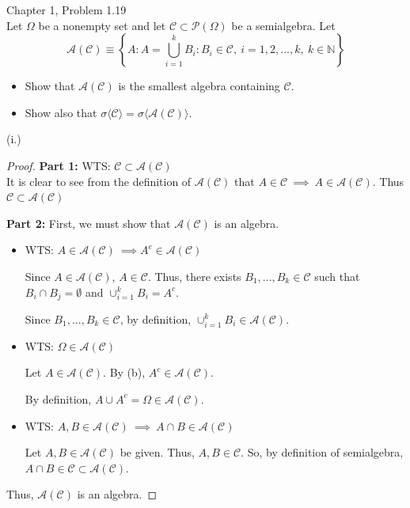 \documentclass[12pt,letterpaper, onecolumn]{exam}
\newcommand{\nat}{\mathbb{N}}
\newcommand{\power}{\mathcal{P}}
\newcommand{\calA}{\mathcal{A}}
\newcommand{\calC}{\mathcal{C}}
\begin{document}
\begin{questions}
    \question Chapter 1, Problem 1.19 \\
    Let $\Omega$ be a nonempty set and let $\calC \subset \power(\Omega)$ be a semialgebra. Let
    \[\calA(\calC) \equiv \left\{A: A = \bigcup_{i=1}^k B_i: B_i \in \calC, \: i = 1, 2, ... , k, \: k \in \nat \right \}\]
    \begin{itemize}
        \item[(i)] Show that $\calA(\calC)$ is the smallest algebra containing $\calC$. 
        \item[(ii)] Show also that $\sigma \langle \calC\rangle  = \sigma \langle \calA(\calC)\rangle $.
    \end{itemize}

    \begin{solution}
    
    (i.)
    \begin{proof}
    \textbf{Part 1:} WTS: $\calC \subset \calA(\calC)$\\
    It is clear to see from the definition of $\calA(\calC)$ that $A \in \calC \: \implies \: A \in \calA(\calC)$. Thus $\calC \subset \calA(\calC)$
    
    \textbf{Part 2:} First, we must show that $\calA(\calC)$ is an algebra.
    \begin{itemize}
       \item[(b)] WTS: $A \in \calA(\calC)  \: \implies A^c \in \calA(\calC)$ 

        Since $A \in \calA(\calC)$, $A \in \calC$. Thus, there exists $B_1, ... , B_k \in \calC$ such that $B_i \cap B_j = \emptyset$ and $\cup_{i=1}^k B_i = A^c$. 

        Since $B_1, ... , B_k \in \calC$, by definition, $\cup_{i = 1}^k B_i \in \calA(\calC)$.

        \item[(a)]  WTS: $\Omega \in \calA(\calC)$

        Let $A \in \calA(\calC)$. By (b), $A^c \in \calA(\calC)$. 

        By definition, $A \cup A^c = \Omega \in \calA(\calC)$. 
        \item[(c)] WTS: $A, B \in \calA(\calC) \: \implies \: A \cap B \in \calA(\calC)$ 

        Let $A, B \in \calA(\calC)$ be given. Thus, $A, B \in \calC.$ So, by definition of semialgebra, $A \cap B \in  \calC \subset  \calA(\calC)$. 
    \end{itemize}
    Thus, $\calA(\calC)$ is an algebra. 


\end{proof}
\end{solution}
\end{questions}
\end{document}

